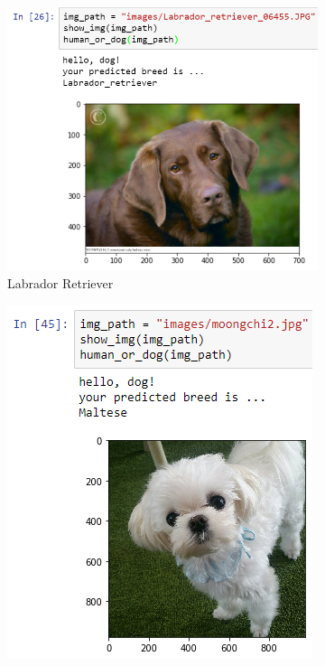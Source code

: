 \documentclass[a4paper]{article}
\begin{document}
\begin{figure}
    \centering
    \begin{subfigure}[b]{0.3\textwidth}
        \includegraphics[width=\textwidth]{images/example0}
        \caption{Labrador Retriever}
        \label{fig:labrador_retriever}
    \end{subfigure}
    \begin{subfigure}[b]{0.3\textwidth}
        \includegraphics[width=\textwidth]{images/example1}

\end{subfigure}
\end{figure}
\end{document}
